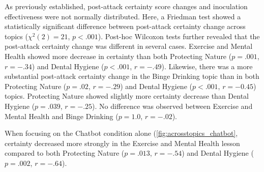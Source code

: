 \documentclass[sigconf]{acmart}
\begin{document}
As previously established, post-attack certainty score changes and inoculation effectiveness were not normally distributed.
Here, a Friedman test showed a statistically significant difference between post-attack certainty change across topics ($\chi^2(2) = 21$, $p < .001$).
Post-hoc Wilcoxon tests further revealed that the post-attack certainty change was different in several cases. 
Exercise and Mental Health showed more decrease in certainty than both Protecting Nature ($p = .001$, $r = -.34$) and Dental Hygiene ($p < .001$, $r = -.49$).
Likewise, there was a more substantial post-attack certainty change in the Binge Drinking topic than in both Protecting Nature ($p = .02$, $r = -.29$) and Dental Hygiene ($p < .001$, $r = -0.45$) topics. 
Protecting Nature showed slightly more certainty decrease than Dental Hygiene ($p = .039$, $r = -.25$). 
No difference was observed between Exercise and Mental Health and Binge Drinking ($p = 1.0$, $r = -.02$). 

When focusing on the Chatbot condition alone (\autoref{fig:acrosstopics_chatbot}, certainty decreased more strongly in the Exercise and Mental Health lesson compared to both Protecting Nature ($p = .013$, $r = -.54$) and Dental Hygiene ($p = .002$, $r = -.64$).
\end{document}
